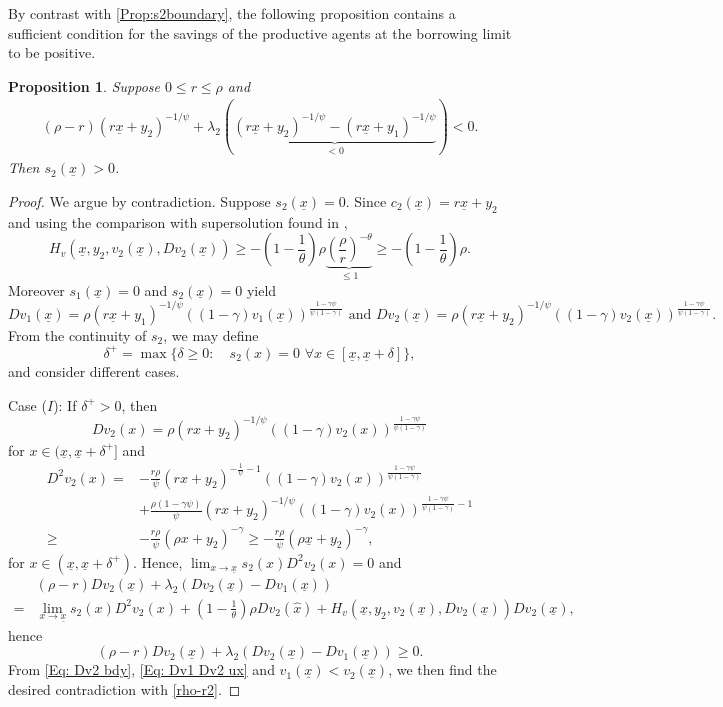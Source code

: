 \documentclass[11pt]{article}
\numberwithin{equation}{section}
\newtheorem{prop}[thm]{Proposition}
\theoremstyle{definition}
\newcommand{\ux}{{\underline x}}
\newcommand{\beq}{\begin{equation}}
\newcommand{\eeq}{\end{equation}}
\newcommand{\g}{\gamma}
\newcommand{\p}{\psi}
\newcommand{\hx}{\hat{x}}
\newcommand{\lc}{\left(}
\newcommand{\rc}{\right)}
\theoremstyle{plain}
\begin{document}
By contrast with \cref{Prop:s2boundary}, the following proposition contains a sufficient condition for the savings of the productive agents at the borrowing limit to be positive. 
\begin{prop}\label{Prop:s2boundary 2}
Suppose $0\leq r\leq \rho$ and 
\beq\label{rho-r2}
\begin{aligned}
\lc \rho-r\rc(r\ux+y_2)^{-1/\psi}+\lambda_2\lc \underbrace{(r\ux+y_2)^{-1/\psi}-(r\ux+y_1)^{-1/\psi}}_{<0}\rc< 0.
\end{aligned}
\eeq
Then $s_2(\ux)>0$. 
\end{prop}
\begin{proof}
We argue by contradiction. Suppose $s_2(\ux)=0$. Since $c_2(\ux)=r\ux+y_2$ and using the comparison with supersolution found in ,  
$$
H_v(\ux,y_2,v_2(\ux),Dv_2(\ux))\geq -\lc 1-\frac{1}{\theta}\rc \rho \underbrace{\lc \frac{\rho}{r}\rc^{-\theta}}_{\leq 1}\geq -\lc 1-\frac{1}{\theta}\rc \rho.
$$
Moreover $s_1(\ux)=0$ and $s_2(\ux)=0$ yield 
\beq\label{Eq: Dv1 Dv2 ux}
Dv_1(\ux)=\rho(r\ux+y_1)^{-1/\p}((1-\g)v_1(\ux))^{\frac{1-\g \p}{\p(1-\g)}}\,\, {\text{and}}\,\, Dv_2(\ux)=\rho(r\ux+y_2)^{-1/\p}((1-\g)v_2(\ux))^{\frac{1-\g \p}{\p(1-\g)}}.
\eeq
From the continuity of $s_2$, we may define 
 $$
 \delta^+=\max \{\delta\geq 0: \quad s_2(x)= 0\,\,\forall x\in [\ux,\ux+\delta]\},
 $$
 and consider different cases.\par 
Case ($I$): If $\delta^+>0$, then 
 $$
 Dv_2(x)=\rho(rx+y_2)^{-1/\p}((1-\g)v_2(x))^{\frac{1-\g \p}{\p(1-\g)}}
 $$ 
 for $x\in (\ux,\ux+\delta^+]$ and
 $$
 \begin{aligned}
 D^2v_2(x)={}&-\frac{r\rho}{\p}(rx+y_2)^{-\frac{1}{\p}-1}((1-\g)v_2(x))^{\frac{1-\g \p}{\p(1-\g)}}\\
 {}&+\frac{\rho(1-\g \p)}{\p}(rx+y_2)^{-1/\p}((1-\g)v_2(x))^{\frac{1-\g \p}{\p(1-\g)}-1}\\
\geq  {}&-\frac{r\rho}{\p}(\rho x+y_2)^{-\g}\geq -\frac{r\rho}{\p}(\rho \ux+y_2)^{-\g},
\end{aligned}
 $$
 for $x\in (\ux,\ux+\delta^+)$. Hence, $\lim_{x\to \ux}s_2(x)D^2v_2(x)=0$ and
$$
\begin{aligned}
&\lc \rho-r\rc Dv_2(\ux)+\lambda_2\lc Dv_2(\ux)-Dv_1(\ux)\rc\\
={}&\lim_{x\to \ux}s_2(x)D^2v_2(x)+\lc 1-\frac{1}{\theta}\rc \rho Dv_2(\hx)+H_v(\ux,y_2,v_2(\ux),Dv_2(\ux))Dv_2(\ux),
\end{aligned}
$$
hence
\beq\label{Eq: Dv2 bdy}
\lc \rho-r\rc Dv_2(\ux)+\lambda_2\lc Dv_2(\ux)-Dv_1(\ux)\rc \geq 0.
\eeq
From \eqref{Eq: Dv2 bdy}, \eqref{Eq: Dv1 Dv2 ux} and $v_1(\ux)<v_2(\ux)$, we then find the desired contradiction with \eqref{rho-r2}.\par

\end{proof}
\end{document}
